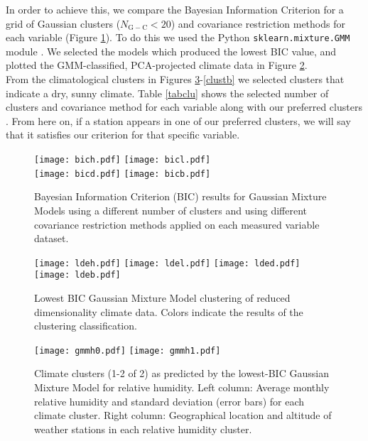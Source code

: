 \documentclass[12pt]{iopart}
\begin{document}
In order to achieve this, we compare the Bayesian Information Criterion \cite{bicref} for a grid of Gaussian clusters ($N_\mathrm{G-C}<20$) and covariance restriction methods for each variable (Figure \ref{bic}). To do this we used the Python \texttt{sklearn.mixture.GMM} module \cite{sklearn}. We selected the models which produced the lowest BIC value, and plotted the GMM-classified, PCA-projected climate data in Figure \ref{lde}. \\

From the climatological clusters in Figures \ref{clusth}-\ref{clustb} we selected clusters that indicate a dry, sunny climate. Table \ref{tabclu} shows the selected number of clusters and covariance method for each variable along with our preferred clusters . From here on, if a station appears in one of our preferred clusters, we will say that it satisfies our criterion for that specific variable.\\

\begin{figure}
\begin{center}
\texttt{[image: bich.pdf]}
\texttt{[image: bicl.pdf]}\\
\texttt{[image: bicd.pdf]}
\texttt{[image: bicb.pdf]}
\caption{Bayesian Information Criterion (BIC) results for Gaussian Mixture Models using a different number of clusters and using different covariance restriction methods \cite{sklearn} applied on each measured variable dataset.}\label{bic}
\end{center}
\end{figure}





\begin{figure}
\begin{center}
\texttt{[image: ldeh.pdf]}
\texttt{[image: ldel.pdf]}
\texttt{[image: lded.pdf]}
\texttt{[image: ldeb.pdf]}
\caption{Lowest BIC Gaussian Mixture Model clustering of reduced dimensionality climate data. Colors indicate the results of the clustering classification.}\label{lde}
\end{center}
\end{figure}

\begin{figure}
\begin{center}
\texttt{[image: gmmh0.pdf]}
\texttt{[image: gmmh1.pdf]}
\caption{Climate clusters (1-2 of 2) as predicted by the lowest-BIC Gaussian Mixture Model for relative humidity. Left column: Average monthly relative humidity and standard deviation (error bars) for each climate cluster. Right column: Geographical location and altitude of weather stations in each relative humidity cluster.}\label{clusth}
\end{center}
\end{figure}
\end{document}

